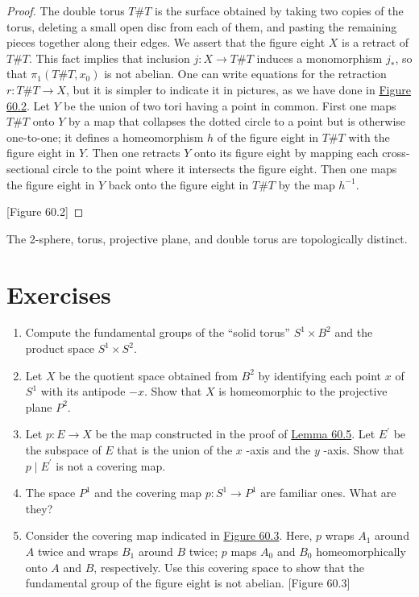 \begin{proof}
The double torus \(T\# T\) is the surface obtained by taking two copies of the torus, deleting a small open disc from each of them, and pasting the remaining pieces together along their edges. We assert that the figure eight \(X\) is a retract of \(T\# T\). This fact implies that inclusion \(j : X \rightarrow T\# T\) induces a monomorphism \(j_{ * }\), so that \({\pi }_{1}( {T\# T,x_{0}})\) is not abelian.
One can write equations for the retraction \(r : T\# T \rightarrow X\), but it is simpler to indicate it in pictures, as we have done in \hyperref[fig:60.2]{Figure 60.2}. Let \(Y\) be the union of two tori having a point in common. First one maps \(T\# T\) onto \(Y\) by a map that collapses the dotted circle to a point but is otherwise one-to-one; it defines a homeomorphism \(h\) of the figure eight in \(T\# T\) with the figure eight in \(Y\). Then one retracts \(Y\) onto its figure eight by mapping each cross-sectional circle to the point where it intersects the figure eight. Then one maps the figure eight in \(Y\) back onto the figure eight in \(T\# T\) by the map \(h^{-1}\).

[Figure 60.2]
\end{proof}
\begin{corollary}
\label{cor:\thetheorem}
The 2-sphere, torus, projective plane, and double torus are topologically distinct.
\end{corollary}

\section*{Exercises}
\begin{enumerate}[itemsep=0.4em, parsep=0pt, topsep=0pt, partopsep=0pt, leftmargin=*, label=\arabic*., ref=\arabic*]
\item Compute the fundamental groups of the ``solid torus'' \(S^{1} \times {B}^{2}\) and the product space \(S^{1} \times {S}^{2}\).
\item Let \(X\) be the quotient space obtained from \(B^{2}\) by identifying each point \(x\) of \(S^{1}\) with its antipode \(- x\). Show that \(X\) is homeomorphic to the projective plane \(P^{2}\).
\item Let \(p : E \rightarrow X\) be the map constructed in the proof of \hyperref[lem:60.5]{Lemma 60.5}. Let \(E^{\prime }\) be the subspace of \(E\) that is the union of the \(x\) -axis and the \(y\) -axis. Show that \(p \mid {E}^{\prime }\) is not a covering map.
\item The space \(P^{1}\) and the covering map \(p : S^{1} \rightarrow {P}^{1}\) are familiar ones. What are they?
\item Consider the covering map indicated in \hyperref[fig:60.3]{Figure 60.3}. Here, \(p\) wraps \(A_{1}\) around \(A\) twice and wraps \(B_{1}\) around \(B\) twice; \(p\) maps \(A_{0}\) and \(B_{0}\) homeomorphically onto \(A\) and \(B\), respectively. Use this covering space to show that the fundamental group of the figure eight is not abelian. [Figure 60.3]
\end{enumerate}